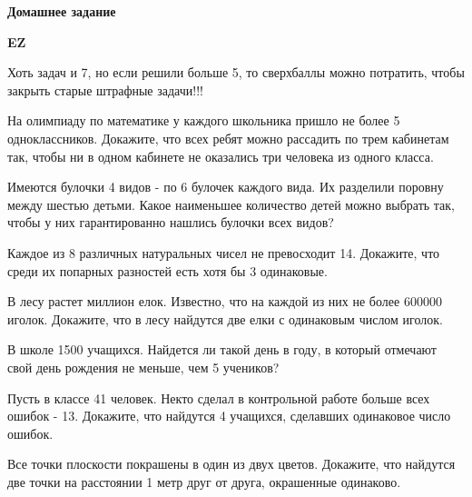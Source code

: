 \centerline{\bf \Huge Домашнее задание}
\centerline{\bf \Huge EZ}

\begin{flushright}
        \scriptsize{Хоть задач и 7, но если решили больше 5, то сверхбаллы можно потратить, чтобы закрыть старые штрафные задачи!!!}
\end{flushright}

На олимпиаду по математике у каждого школьника пришло не более 5 одноклассников. Докажите, что всех ребят можно рассадить по трем кабинетам так, чтобы ни в одном кабинете не оказались три человека из одного класса.

Имеются булочки 4 видов - по 6 булочек каждого вида. Их разделили поровну между шестью детьми. Какое наименьшее количество детей можно выбрать так, чтобы у них гарантированно нашлись булочки всех видов?


Каждое из 8 различных натуральных чисел не превосходит 14. Докажите, что среди их попарных разностей есть хотя бы 3 одинаковые.

В лесу растет миллион елок. Известно, что на каждой из них не более 600000 иголок. Докажите, что в лесу найдутся две елки с одинаковым числом иголок.

В школе 1500 учащихся. Найдется ли такой день в году, в который отмечают свой день рождения не меньше, чем 5 учеников?

Пусть в классе 41 человек. Некто сделал в контрольной работе больше всех ошибок - 13. Докажите, что найдутся 4 учащихся, сделавших одинаковое число ошибок.

Все точки плоскости покрашены в один из двух цветов. Докажите, что найдутся две точки на расстоянии 1 метр друг от друга, окрашенные одинаково.